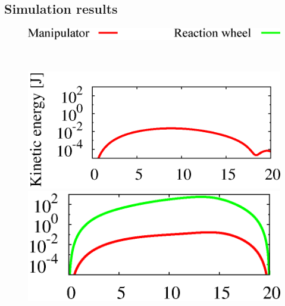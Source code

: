 \subsection{Simulation results}
%
\begin{figure}[t]
  \centering
  \begin{minipage}[h]{0.5\linewidth}
    \centering
    \includegraphics[width=1.0\linewidth]{fig/chapter5/comparison/energy.eps}
  \end{minipage}\\
  \vspace{-4mm}
  \begin{minipage}[h]{0.40\linewidth}
    \centering
    \includegraphics[width=1.0\linewidth]{fig/chapter5/comparison/RL-M/RNS_U10_partial_kinetic_energy.eps}
  \end{minipage}
  \hspace{-4mm}
  \begin{minipage}[h]{0.40\linewidth}
    \centering
    \includegraphics[width=1.0\linewidth]{fig/chapter5/comparison/RW-M/RNS_U10_partial_kinetic_energy.eps}
  \end{minipage}\\

\end{figure}
